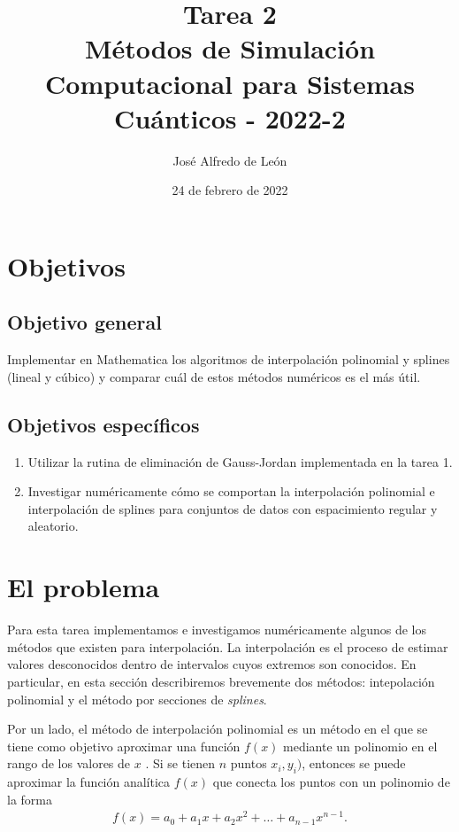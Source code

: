 \documentclass[11pt,letterpaper]{article}
\author{José Alfredo de León}
\title{Tarea 2\\
\large{Métodos de Simulación Computacional para Sistemas Cuánticos - 2022-2}}
\begin{document}
\date{24 de febrero de 2022}
\maketitle

\section{Objetivos}

\subsection{Objetivo general}
Implementar en Mathematica 
los algoritmos de interpolación polinomial y splines (lineal y cúbico) y
comparar cuál de estos métodos numéricos es el más útil.

\subsection{Objetivos específicos}
\begin{enumerate}
\item Utilizar la rutina de eliminación de Gauss-Jordan implementada en 
la tarea 1.
\item Investigar numéricamente cómo se comportan la interpolación polinomial
e interpolación de splines para conjuntos de datos con espacimiento regular
y aleatorio.
\end{enumerate}

\section{El problema}
Para esta tarea implementamos e investigamos numéricamente algunos 
de los métodos que existen para interpolación. La interpolación es el proceso
de estimar valores desconocidos dentro de intervalos cuyos extremos son
conocidos. En particular, en esta sección describiremos brevemente dos métodos:
intepolación polinomial y el método por secciones de \textit{splines}.

Por un lado, el método de interpolación polinomial es un método en el que
se tiene como objetivo aproximar una función $f(x)$ mediante un polinomio 
en el rango de los valores de $x$ \cite{cohen2011numerical}. Si se tienen $n$ puntos
$x_i,y_i)$, entonces se puede aproximar la función analítica
$f(x)$ que conecta los puntos con un polinomio de la forma
\begin{align}\label{eq:interpolation_poly}
f(x)=a_0+a_1x+a_2x^2+\ldots+a_{n-1}x^{n-1}.
\end{align}
\end{document}
